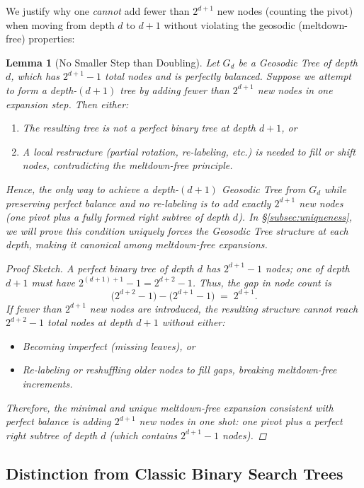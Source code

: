\documentclass[acmsmall]{acmart}
\newtheorem{lemma}[theorem]{Lemma}
\theoremstyle{definition}
\theoremstyle{remark}
\begin{document}
We justify why one \emph{cannot} add fewer than $2^{d+1}$ new nodes (counting the pivot) 
when moving from depth $d$ to $d+1$ without violating the geosodic (meltdown-free) properties:

\begin{lemma}[No Smaller Step than Doubling]
\label{lem:no-smaller-step}
Let $G_d$ be a Geosodic Tree of depth $d$, which has $2^{d+1}-1$ total nodes 
and is perfectly balanced. Suppose we attempt to form a depth-$(d+1)$ tree by adding 
fewer than $2^{d+1}$ new nodes in one expansion step. Then either:
\begin{enumerate}
  \item The resulting tree is \emph{not} a perfect binary tree at depth $d+1$, or
  \item A local restructure (partial rotation, re-labeling, etc.) is needed to fill 
        or shift nodes, contradicting the meltdown-free principle.
\end{enumerate}
Hence, the only way to achieve a depth-$(d+1)$ Geosodic Tree from $G_d$ while preserving 
perfect balance and no re-labeling is to add exactly $2^{d+1}$ new nodes (one pivot plus a 
fully formed right subtree of depth $d$). In \S\ref{subsec:uniqueness},
we will prove this condition uniquely forces the Geosodic Tree structure
at each depth, making it \emph{canonical} among meltdown-free expansions.

\begin{proof}[Proof Sketch]
A perfect binary tree of depth $d$ has $2^{d+1}-1$ nodes; 
one of depth $d+1$ must have $2^{(d+1)+1}-1 = 2^{d+2}-1$. 
Thus, the gap in node count is 
\[
  \bigl(2^{d+2}-1\bigr) - \bigl(2^{d+1}-1\bigr) 
  \;=\;
  2^{d+1}.
\]
If fewer than $2^{d+1}$ new nodes are introduced, the resulting structure 
cannot reach $2^{d+2}-1$ total nodes at depth $d+1$ without either:
\begin{itemize}
  \item Becoming imperfect (missing leaves), or
  \item Re-labeling or reshuffling older nodes to fill gaps, breaking meltdown-free increments.
\end{itemize}
Therefore, the minimal and \emph{unique} meltdown-free expansion consistent with 
perfect balance is adding $2^{d+1}$ new nodes in one shot: 
one pivot plus a perfect right subtree of depth $d$ (which contains $2^{d+1}-1$ nodes).
\end{proof}
\end{lemma}

\subsection{Distinction from Classic Binary Search Trees}
\label{sec:distinction}
\end{document}
